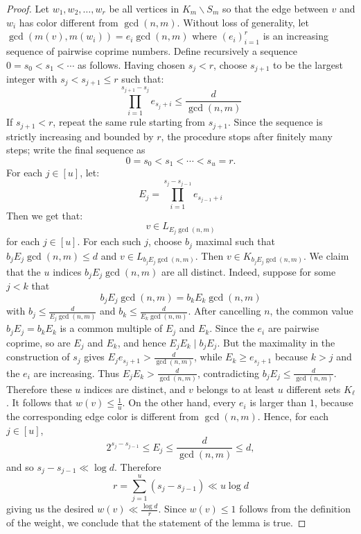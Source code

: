 \documentclass[11pt]{amsart}
\theoremstyle{remark}
\begin{document}
\begin{proof}
  Let $w_1, w_2, \ldots, w_r$ be all vertices in $K_m \backslash S_m$ so that the edge between $v$ and $w_i$ has color different from $\gcd(n, m)$. Without loss of generality, let $\gcd(m(v), m(w_i)) = e_i\gcd(n,m)$ where $(e_i)_{i = 1}^r$ is an increasing sequence of pairwise coprime numbers. Define recursively a sequence $0=s_0<s_1<\cdots$ as follows. Having chosen $s_j<r$, choose $s_{j+1}$ to be the largest integer with $s_j<s_{j+1}\le r$ such that:
  \begin{equation}
    \prod_{i = 1}^{s_{j+1} - s_j} e_{s_j + i} \leq \frac{d}{\gcd(n, m)}
  \end{equation}
  If $s_{j+1}<r$, repeat the same rule starting from $s_{j+1}$. Since the sequence is strictly increasing and bounded by $r$, the procedure stops after finitely many steps; write the final sequence as
  \[
    0=s_0<s_1<\cdots<s_u=r.
  \]
  For each $j \in [u]$, let:
  \begin{equation}
    E_j = \prod_{i = 1}^{s_j - s_{j-1}} e_{s_{j-1} + i}
  \end{equation}
  Then we get that:
  \begin{equation}
    v \in L_{E_j \gcd(n,m)}
  \end{equation}
  for each $j \in [u]$. For each such $j$, choose $b_j$ maximal such that $b_jE_j \gcd(n,m)\le d$ and $v\in L_{b_jE_j\gcd(n, m)}$. Then $v\in K_{b_jE_j\gcd(n,m)}$. We claim that the $u$ indices $b_jE_j\gcd(n,m)$ are all distinct. Indeed, suppose for some $j<k$ that
  \begin{equation}
    b_j E_j \gcd(n, m) = b_k E_k \gcd(n, m)
  \end{equation}
  with $b_j\le \frac{d}{E_j\gcd(n,m)}$ and $b_k\le \frac{d}{E_k\gcd(n,m)}$. After cancelling $n$, the common value $b_jE_j=b_kE_k$ is a common multiple of $E_j$ and $E_k$. Since the $e_i$ are pairwise coprime, so are $E_j$ and $E_k$, and hence $E_jE_k\mid b_jE_j$. But the maximality in the construction of $s_j$ gives $E_j e_{s_j+1}>\frac{d}{\gcd(n,m)}$, while $E_k\ge e_{s_j+1}$ because $k>j$ and the $e_i$ are increasing. Thus $E_jE_k>\frac{d}{\gcd(n,m)}$, contradicting $b_jE_j\le \frac{d}{\gcd(n,m)}$. Therefore these $u$ indices are distinct, and $v$ belongs to at least $u$ different sets $K_\ell$. It follows that $w(v)\le \frac{1}{u}$. On the other hand, every $e_i$ is larger than $1$, because the corresponding edge color is different from $\gcd(n,m)$. Hence, for each $j \in [u]$,
  \[
    2^{s_j-s_{j-1}}\le E_j\le \frac{d}{\gcd(n,m)}\le d,
  \]
  and so $s_j-s_{j-1}\ll \log d$. Therefore
  \begin{equation}
    r = \sum_{j = 1}^u (s_j - s_{j-1}) \ll u \log d 
  \end{equation}
  giving us the desired $w(v) \ll \frac{\log d}{r}$. Since $w(v) \leq 1$ follows from the definition of the weight, we conclude that the statement of the lemma is true.
\end{proof}
\end{document}
